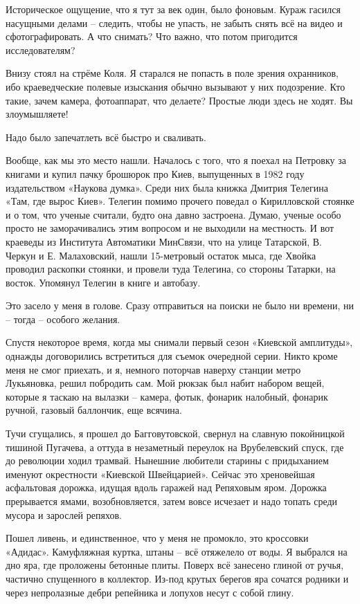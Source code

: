 Историческое ощущение, что я тут за век один, было фоновым. Кураж гасился насущными делами – следить, чтобы не упасть, не забыть снять всё на видео и сфотографировать. А что снимать? Что важно, что потом пригодится исследователям?

Внизу стоял на стрёме Коля. Я старался не попасть в поле зрения охранников, ибо краеведческие полевые изыскания обычно вызывают у них подозрение. Кто такие, зачем камера, фотоаппарат, что делаете? Простые люди здесь не ходят. Вы злоумышляете!

Надо было запечатлеть всё быстро и сваливать.

Вообще, как мы это место нашли. Началось с того, что я поехал на Петровку за книгами и купил пачку брошюрок про Киев, выпущенных в 1982 году издательством «Наукова думка». Среди них была книжка Дмитрия Телегина «Там, где вырос Киев». Телегин помимо прочего поведал о Кирилловской стоянке и о том, что ученые считали, будто она давно застроена. Думаю, ученые особо просто не заморачивались этим вопросом и не выходили на местность. И вот краеведы из Института Автоматики МинСвязи, что на улице Татарской, В. Черкун и Е. Малаховский, нашли 15-метровый остаток мыса, где Хвойка проводил раскопки стоянки, и провели туда Телегина, со стороны Татарки, на восток. Упомянул Телегин в книге и автобазу.

Это засело у меня в голове. Сразу отправиться на поиски не было ни времени, ни – тогда – особого желания.

Спустя некоторое время, когда мы снимали первый сезон «Киевской амплитуды», однажды договорились встретиться для съемок очередной серии. Никто кроме меня не смог приехать, и я, немного поторчав наверху станции метро Лукьяновка, решил побродить сам. Мой рюкзак был набит набором вещей, которые я таскаю на вылазки – камера, фотык, фонарик налобный, фонарик ручной, газовый баллончик, еще всячина.

Тучи сгущались, я прошел до Багговутовской, свернул на славную покойницкой тишиной Пугачева, а оттуда в незаметный переулок на Врубелевский спуск, где до революции ходил трамвай. Нынешние любители старины с придыханием именуют окрестности «Киевской Швейцарией». Сейчас это хреновейшая асфальтовая дорожка, идущая вдоль гаражей над Репяховым яром. Дорожка прерывается ямами, возобновляется, затем вовсе исчезает и надо топать среди мусора и зарослей репяхов.

Пошел ливень, и единственное, что у меня не промокло, это кроссовки «Адидас». Камуфляжная куртка, штаны – всё отяжелело от воды. Я выбрался на дно яра, где проложены бетонные плиты. Поверх всё занесено глиной от ручья, частично спущенного в коллектор. Из-под крутых берегов яра сочатся родники и через непролазные дебри репейника и лопухов несут с собой глину.

